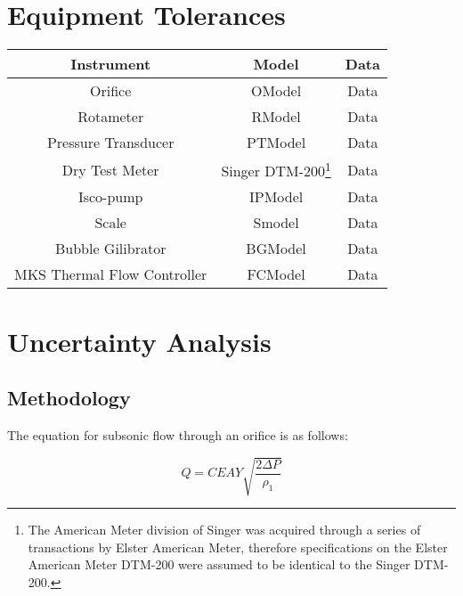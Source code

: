 \documentclass[paper=letter, fontsize=10pt]{scrartcl} %
\begin{document}
\clearpage
\begin{appendices}
\setcounter{equation}{0}
\section{Equipment Tolerances}\label{app:Equip}

\begin{center}
\begin{tabular}{ | c | c | c |}
 \hline
 Instrument & Model & Data \\
 \hline\hline
 Orifice & OModel & Data \\
 \hline
 Rotameter & RModel & Data \\
 \hline
 Pressure Transducer & PTModel & Data \\
 \hline
 Dry Test Meter & Singer DTM-200\footnote{The American Meter division of Singer was acquired through a series of transactions by Elster American Meter, therefore specifications on the Elster American Meter DTM-200 were assumed to be identical to the Singer DTM-200.} & Data \\
 \hline
 Isco-pump & IPModel & Data \\
 \hline
 Scale & Smodel & Data \\
 \hline
 Bubble Gilibrator & BGModel & Data \\
 \hline
 MKS Thermal Flow Controller & FCModel & Data \\
 \hline
\end{tabular}
\end{center}

\clearpage
\section{Uncertainty Analysis}
\subsection{Methodology}

The equation for subsonic flow through an orifice is as follows:

\begin{equation}\label{eq:1}
Q = C E A Y \sqrt{\frac{2 \Delta P}{\rho_1}}
\end{equation}


\end{appendices}
\end{document}
